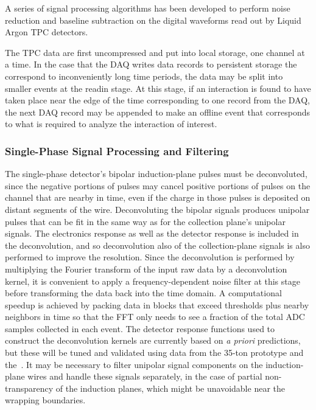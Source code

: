 A series of signal processing algorithms has been developed to
perform noise reduction and baseline subtraction on the digital
waveforms read out by Liquid Argon TPC detectors. 

The TPC data are first uncompressed and put into local storage, one channel at a time.  
In the case that the DAQ writes data records to persistent
storage the correspond to inconveniently long time periods, the data may be split
into smaller events at the readin stage.  At this stage, if an interaction is found
to have taken place near the edge of the time corresponding to one record from the DAQ,
the next DAQ record may be appended to make an offline event that corresponds to
what is required to analyze the interaction of interest.

\subsubsection{Single-Phase Signal Processing and Filtering}

The single-phase detector's bipolar induction-plane pulses must be deconvoluted,
since the negative portions of pulses may cancel positive portions of pulses on the channel
that are nearby in time, even if the charge in those pulses is deposited on distant segments
of the wire.  Deconvoluting the bipolar signals produces unipolar pulses that can be fit in the
same way as for the collection plane's unipolar signals.  
The electronics response as well as the detector response is included in the
deconvolution, and so deconvolution also of the collection-plane signals is also performed to improve
the resolution.   Since the deconvolution is performed by multiplying the Fourier transform of the
input raw data by a deconvolution kernel, it is convenient to apply a frequency-dependent noise filter
at this stage before transforming the data back into the time domain.
A computational speedup is achieved by packing data in
blocks that exceed thresholds plus nearby neighbors in time so that
the FFT only needs to see a fraction of the total ADC samples
collected in each event.
The detector response functions used to construct the deconvolution kernels are currently
based on \textit{a priori} predictions, but these will be tuned and
validated using data from the 35-ton prototype and the~\cernsingleproto.
It may be necessary to filter unipolar signal components on the induction-plane
wires and handle these signals separately, in the case of partial
non-transparency of the induction planes, which might be unavoidable
near the wrapping boundaries.  


